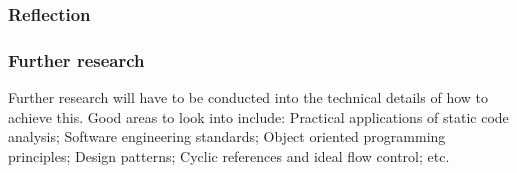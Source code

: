 \subsubsection{Reflection}

\subsubsection{Further research}
Further research will have to be conducted into the technical details of how to achieve this. Good areas to look into include: Practical applications of static code analysis; Software engineering standards; Object oriented programming principles; Design patterns; Cyclic references and ideal flow control; etc.